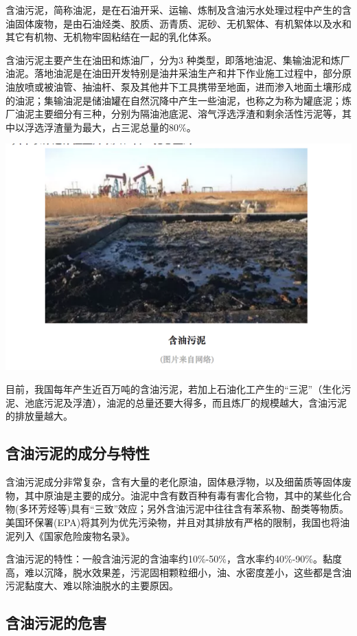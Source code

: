\documentclass[]{book}
\begin{document}
含油污泥，简称油泥，是在石油开采、运输、炼制及含油污水处理过程中产生的含油固体废物，是由石油烃类、胶质、沥青质、泥砂、无机絮体、有机絮体以及水和其它有机物、无机物牢固粘结在一起的乳化体系。

含油污泥主要产生在油田和炼油厂，分为3
种类型，即落地油泥、集输油泥和炼厂油泥。落地油泥是在油田开发特别是油井采油生产和井下作业施工过程中，部分原油放喷或被油管、抽油杆、泵及其他井下工具携带至地面，进而渗入地面土壤形成的油泥；集输油泥是储油罐在自然沉降中产生一些油泥，也称之为称为罐底泥；炼厂油泥主要细分有三种，分别为隔油池底泥、溶气浮选浮渣和剩余活性污泥等，其中以浮选浮渣量为最大，占三泥总量的80\%。

\includegraphics[width=8.33in]{images/youni3}

目前，我国每年产生近百万吨的含油污泥，若加上石油化工产生的``三泥''（生化污泥、池底污泥及浮渣），油泥的总量还要大得多，而且炼厂的规模越大，含油污泥的排放量越大。

\subsection{含油污泥的成分与特性}

含油污泥成分非常复杂，含有大量的老化原油，固体悬浮物，以及细菌质等固体废物，其中原油是主要的成分。油泥中含有数百种有毒有害化合物，其中的某些化合物(多环芳烃等)具有``三致''效应；另外含油污泥中往往含有苯系物、酚类等物质。美国环保署(EPA)将其列为优先污染物，并且对其排放有严格的限制，我国也将油泥列入《国家危险废物名录》。

含油污泥的特性：一般含油污泥的含油率约10\%-50\%，含水率约40\%-90\%。黏度高，难以沉降，脱水效果差，污泥固相颗粒细小，油、水密度差小，这些都是含油污泥黏度大、难以除油脱水的主要原因。

\subsection{含油污泥的危害}
\end{document}
